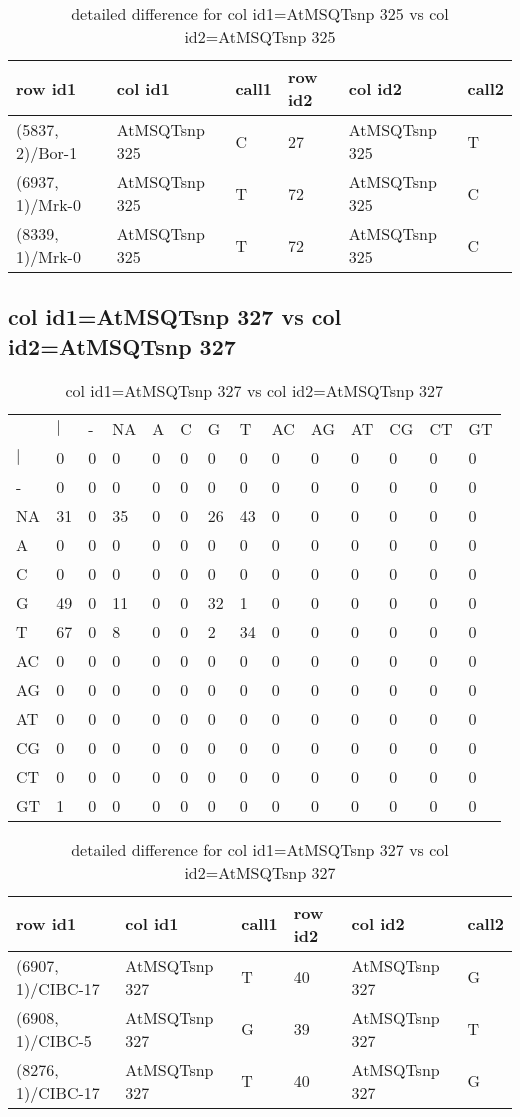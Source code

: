 \begin{center}
\begin{longtable}{|l|l|l|l|l|l|}
\caption{detailed difference for col id1=AtMSQTsnp 325 vs col id2=AtMSQTsnp 325} \label{table_dm855}\\
\hline
row id1&col id1&call1&row id2&col id2&call2\\
\hline
(5837, 2)/Bor-1&AtMSQTsnp 325&C&27&AtMSQTsnp 325&T\\
(6937, 1)/Mrk-0&AtMSQTsnp 325&T&72&AtMSQTsnp 325&C\\
(8339, 1)/Mrk-0&AtMSQTsnp 325&T&72&AtMSQTsnp 325&C\\
\hline
\end{longtable}
\end{center}

\subsection{col id1=AtMSQTsnp 327 vs col id2=AtMSQTsnp 327}
\begin{center}
\begin{longtable}{|l|l|l|l|l|l|l|l|l|l|l|l|l|l|}
\caption{col id1=AtMSQTsnp 327 vs col id2=AtMSQTsnp 327} \label{table_dm856}\\
\hline
\\
\hline
&$|$&-&NA&A&C&G&T&AC&AG&AT&CG&CT&GT\\
$|$&0&0&0&0&0&0&0&0&0&0&0&0&0\\
-&0&0&0&0&0&0&0&0&0&0&0&0&0\\
NA&31&0&35&0&0&26&43&0&0&0&0&0&0\\
A&0&0&0&0&0&0&0&0&0&0&0&0&0\\
C&0&0&0&0&0&0&0&0&0&0&0&0&0\\
G&49&0&11&0&0&32&1&0&0&0&0&0&0\\
T&67&0&8&0&0&2&34&0&0&0&0&0&0\\
AC&0&0&0&0&0&0&0&0&0&0&0&0&0\\
AG&0&0&0&0&0&0&0&0&0&0&0&0&0\\
AT&0&0&0&0&0&0&0&0&0&0&0&0&0\\
CG&0&0&0&0&0&0&0&0&0&0&0&0&0\\
CT&0&0&0&0&0&0&0&0&0&0&0&0&0\\
GT&1&0&0&0&0&0&0&0&0&0&0&0&0\\
\hline
\end{longtable}
\end{center}

\begin{center}
\begin{longtable}{|l|l|l|l|l|l|}
\caption{detailed difference for col id1=AtMSQTsnp 327 vs col id2=AtMSQTsnp 327} \label{table_dm857}\\
\hline
row id1&col id1&call1&row id2&col id2&call2\\
\hline
(6907, 1)/CIBC-17&AtMSQTsnp 327&T&40&AtMSQTsnp 327&G\\
(6908, 1)/CIBC-5&AtMSQTsnp 327&G&39&AtMSQTsnp 327&T\\
(8276, 1)/CIBC-17&AtMSQTsnp 327&T&40&AtMSQTsnp 327&G\\
\hline
\end{longtable}
\end{center}


